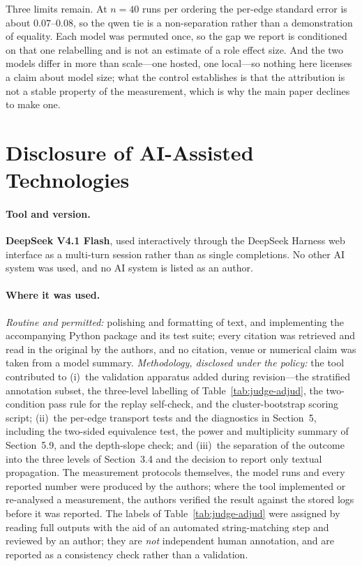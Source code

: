 \documentclass[sigconf,anonymous]{aamas}
\begin{document}
Three limits remain. At $n = 40$ runs per ordering the per-edge standard error is about
$0.07$--$0.08$, so the qwen tie is a non-separation rather than a demonstration of
equality. Each model was permuted once, so the gap we report is conditioned on that one
relabelling and is not an estimate of a role effect size. And the two models differ in
more than scale---one hosted, one local---so nothing here licenses a claim about model
size; what the control establishes is that the attribution is not a stable property of
the measurement, which is why the main paper declines to make one.

\section{Disclosure of AI-Assisted Technologies}
\label{app:ai-disclosure}

\paragraph{Tool and version.} \textbf{DeepSeek V4.1 Flash}, used interactively through
the DeepSeek Harness web interface as a multi-turn session rather than as single
completions. No other AI system was used, and no AI system is listed as an author.

\paragraph{Where it was used.} \emph{Routine and permitted:} polishing and formatting
of text, and implementing the accompanying Python package and its test suite; every
citation was retrieved and read in the original by the authors, and no citation, venue
or numerical claim was taken from a model summary. \emph{Methodology, disclosed under
the policy:} the tool contributed to (i)~the validation apparatus added during
revision---the stratified annotation subset, the three-level labelling of
Table~\ref{tab:judge-adjud}, the two-condition pass rule for the replay self-check, and
the cluster-bootstrap scoring script; (ii)~the per-edge transport tests and the
diagnostics in Section~5, including the two-sided equivalence test, the power and
multiplicity summary of Section~5.9, and the depth-slope check; and (iii)~the separation
of the outcome into the three levels of Section~3.4 and the decision to report only
textual propagation. The measurement protocols themselves, the model runs and every
reported number were produced by the authors; where the tool implemented or re-analysed
a measurement, the authors verified the result against the stored logs before it was
reported. The labels of Table~\ref{tab:judge-adjud} were assigned by reading full
outputs with the aid of an automated string-matching step and reviewed by an author;
they are \emph{not} independent human annotation, and are reported as a consistency
check rather than a validation.
\end{document}
